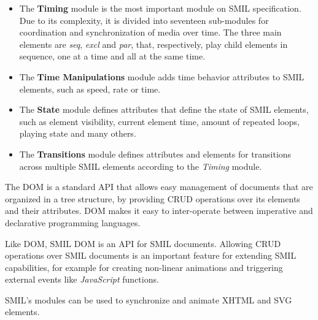 \begin{itemize}
  \item The \textbf{Timing} module is the most important module on \ac{SMIL} specification. Due to its complexity, it is divided into seventeen sub-modules for coordination and synchronization of media over time. The three main elements are \emph{seq}, \emph{excl} and \emph{par}, that, respectively, play child elements in sequence, one at a time and all at the same time. 

  \item The \textbf{Time Manipulations} module adds time behavior attributes to \ac{SMIL} elements, such as speed, rate or time.

  \item The \textbf{State} module defines attributes that define the state of \ac{SMIL} elements, such as element visibility, current element time, amount of repeated loops, playing state and many others.

  \item The \textbf{Transitions} module defines attributes and elements for transitions across multiple \ac{SMIL} elements according to the \emph{Timing} module.

\end{itemize}

The \ac{DOM} is a standard \ac{API} that allows easy management of documents that are organized in a tree structure, by providing \ac{CRUD} operations over its elements and their attributes. \ac{DOM} makes it easy to inter-operate between imperative and declarative programming languages\cite{dom}.

Like \ac{DOM}, \ac{SMIL} \ac{DOM} is an \ac{API} for \ac{SMIL} documents. Allowing \ac{CRUD} operations over \ac{SMIL} documents is an important feature for extending \ac{SMIL} capabilities, for example for creating non-linear animations and triggering external events like \emph{JavaScript} functions.  


  \ac{SMIL}'s modules can be used to synchronize and animate \ac{XHTML} and \ac{SVG} elements.
  
